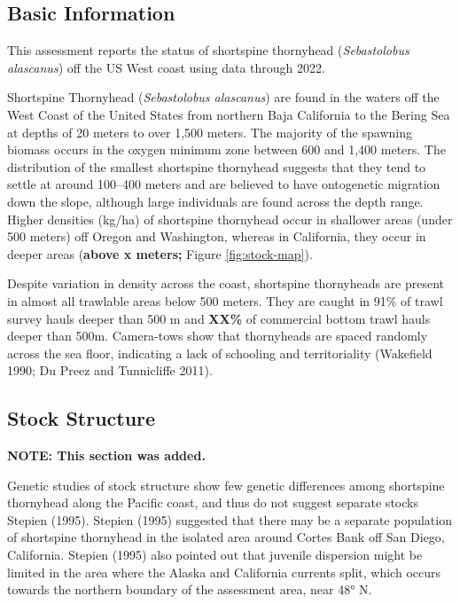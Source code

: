 \documentclass[11pt,
  english,
  letterpaper,
]{article}
\begin{document}
\hypertarget{basic-information}{%
\subsection{Basic Information}\label{basic-information}}

This assessment reports the status of shortspine thornyhead (\emph{Sebastolobus alascanus}) off the US West coast using data through 2022.

Shortspine Thornyhead (\emph{Sebastolobus alascanus}) are found in the waters off the West Coast of the United States from northern Baja California to the Bering Sea at depths of 20 meters to over 1,500 meters. The majority of the spawning biomass occurs in the oxygen minimum zone between 600 and 1,400 meters. The distribution of the smallest shortspine thornyhead suggests that they tend to settle at around 100--400 meters and are believed to have ontogenetic migration down the slope, although large individuals are found across the depth range. Higher densities (kg/ha) of shortspine thornyhead occur in shallower areas (under 500 meters) off Oregon and Washington, whereas in California, they occur in deeper areas (\textbf{above x meters;} Figure \ref{fig:stock-map}).

Despite variation in density across the coast, shortspine thornyheads are present in almost all trawlable areas below 500 meters. They are caught in 91\% of trawl survey hauls deeper than 500 m and \textbf{XX\%} of commercial bottom trawl hauls deeper than 500m. Camera-tows show that thornyheads are spaced randomly across the sea floor, indicating a lack of schooling and territoriality (Wakefield 1990; Du Preez and Tunnicliffe 2011).

\hypertarget{stock-structure}{%
\subsection{Stock Structure}\label{stock-structure}}

\textbf{NOTE: This section was added.}

Genetic studies of stock structure show few genetic differences among shortspine thornyhead along the Pacific coast, and thus do not suggest separate stocks Stepien (1995). Stepien (1995) suggested that there may be a separate population of shortspine thornyhead in the isolated area around Cortes Bank off San Diego, California. Stepien (1995) also pointed out that juvenile dispersion might be limited in the area where the Alaska and California currents split, which occurs towards the northern boundary of the assessment area, near 48° N.
\end{document}
